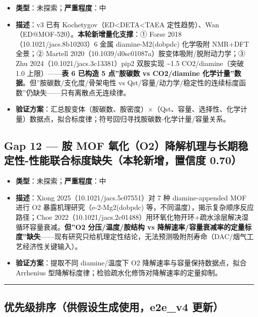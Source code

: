 \documentclass[12pt,a4paper]{ctexart}
\providecommand{\tightlist}{%
  \setlength{\itemsep}{0pt}\setlength{\parskip}{0pt}}
\begin{document}
\begin{itemize}
\tightlist
\item
  \textbf{类型}：未探索；\textbf{严重程度}：中
\item
  \textbf{描述}：v3 已有 Kochetygov（ED\textless DETA\textless TAEA 定性趋势）、Wan（ED@MOF-520）。\textbf{本轮新增量化支撑}：① Forse 2018（10.1021/jacs.8b10203）6 金属 diamine-M2(dobpdc) 化学吸附 NMR+DFT 全景；② Martell 2020（10.1039/d0sc01087a）胺变体吸附/脱附动力学；③ Zhu 2024（10.1021/jacs.3c13381）pip2 双胺实现 \textasciitilde1.5 CO2/diamine（突破 1.0 上限）------\textbf{表 6 已构造 5 点''胺碳数 vs CO2/diamine 化学计量''数据}。但''胺碳数/支化度/骨架电性 vs Qst/容量/动力学/稳定性的连续标度函数''仍缺失------只有离散点无连续律。
\item
  \textbf{验证方案}：汇总胺变体（胺碳数、胺密度）×（Qst、容量、选择性、化学计量）数据点，拟合标度律；符号回归寻找胺碳数-化学计量/容量关系。
\end{itemize}

\subsection{Gap 12 --- 胺 MOF 氧化（O2）降解机理与长期稳定性-性能联合标度缺失（本轮新增，置信度 0.70）}\label{gap:gap-12-ux80fa-mof-ux6c27ux5316o2ux964dux89e3ux673aux7406ux4e0eux957fux671fux7a33ux5b9aux6027-ux6027ux80fdux8054ux5408ux6807ux5ea6ux7f3aux5931ux672cux8f6eux65b0ux589eux7f6eux4fe1ux5ea6-0.70}

\begin{itemize}
\tightlist
\item
  \textbf{类型}：未探索；\textbf{严重程度}：中
\item
  \textbf{描述}：Xiong 2025（10.1021/jacs.5c07551）对 7 种 diamine-appended MOF 进行 O2 暴露机理研究（e-2-Mg2(dobpdc) 等，不同温度），揭示复杂顺序反应路径；Choe 2022（10.1021/jacs.2c01488）用环氧化物开环+疏水涂层解决湿循环容量衰减。\textbf{但''O2 分压/温度/胺结构 vs 降解速率/容量衰减率的定量标度''缺失}------现有研究只给机理定性结论，无法预测吸附剂寿命（DAC/烟气工艺经济性关键输入）。
\item
  \textbf{验证方案}：提取不同 diamine/温度下 O2 降解速率与容量保持数据点，拟合 Arrhenius 型降解标度律；检验疏水化修饰对降解速率的定量抑制。
\end{itemize}

\begin{center}\rule{0.5\linewidth}{0.5pt}\end{center}

\subsection{优先级排序（供假设生成使用，e2e\_v4 更新）}\label{gap:ux4f18ux5148ux7ea7ux6392ux5e8fux4f9bux5047ux8bbeux751fux6210ux4f7fux7528e2e_v4-ux66f4ux65b0}
\end{document}
